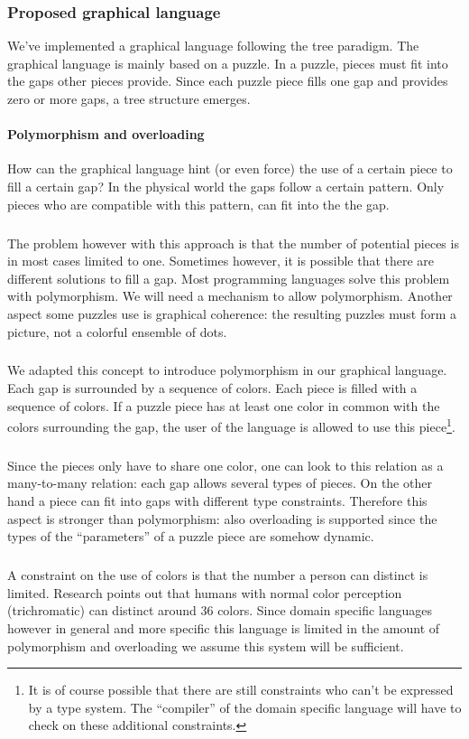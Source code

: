 \subsubsection{Proposed graphical language}
We've implemented a graphical language following the tree paradigm. The
graphical language is mainly based on a puzzle. In a puzzle, pieces must fit
into the gaps other pieces provide. Since each puzzle piece fills one gap and
provides zero or more gaps, a tree structure emerges.
\paragraph{Polymorphism and overloading}
How can the graphical language hint (or even force) the use of a certain piece
to fill a certain gap? In the physical world the gaps follow a certain pattern.
Only pieces who are compatible with this pattern, can fit into the the gap.
\subparagraph{}
The problem however with this approach is that the number of potential pieces
is in most cases limited to one. Sometimes however, it is possible that there
are different solutions to fill a gap. Most programming languages solve this
problem with polymorphism. We will need a mechanism to allow polymorphism.
Another aspect some puzzles use is graphical coherence: the resulting puzzles
must form a picture, not a colorful ensemble of dots.
\subparagraph{}
We adapted this concept to introduce polymorphism in our graphical language.
Each gap is surrounded by a sequence of colors. Each piece is filled with a
sequence of colors. If a puzzle piece has at least one color in common with the
colors surrounding the gap, the user of the language is allowed to use this
piece\footnote{It is of course possible that there are still constraints who
can't be expressed by a type system. The ``compiler'' of the domain specific
language will have to check on these additional constraints.}.
\subparagraph{}
Since the pieces only have to share one color, one can look to this relation as
a many-to-many relation: each gap allows several types of pieces. On the
other hand a piece can fit into gaps with different type constraints. Therefore
this aspect is stronger than polymorphism: also overloading is supported since
the types of the ``parameters'' of a puzzle piece are somehow dynamic.
\subparagraph{}
A constraint on the use of colors is that the number a person can distinct is
limited. Research points out that humans with normal color perception
(trichromatic) can distinct around 36 colors. Since domain specific languages
however in general and more specific this language is limited in the amount of
polymorphism and overloading we assume this system will be sufficient.